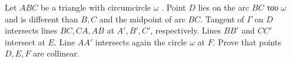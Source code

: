 Let $ABC$ be a triangle with circumcircle $\omega$ . Point $D$ lies on the arc $BC$ του $\omega$ and is different than $B,C$ and the midpoint of arc $BC$.  Tangent of $\Gamma$ on $D$ intersects lines $BC,CA,AB$ at $A',B',C'$,  respectively. Lines $BB'$ and $CC'$ intersect at $E$. Line $AA'$ intersects again the circle  $\omega$ at $F$. Prove that points $D,E,F$ are collinear.
